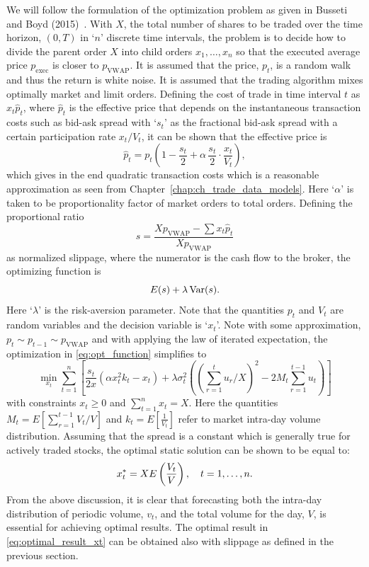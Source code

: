 We will follow the formulation of the optimization problem as given in Busseti and Boyd (2015)~\cite{busseli_boyd}. With $X$, the total number of shares to be traded over the time horizon, $(0,T)$ in `$n$' discrete time intervals, the problem is to decide how to divide the parent order $X$ into child orders $x_1, \ldots, x_n$ so that the executed average price $p_{\text{exec}}$ is closer to $p_{\text{VWAP}}$. It is assumed that the price, $p_t$, is a random walk and thus the return is white noise. It is assumed that the trading algorithm mixes optimally market and limit orders. Defining the cost of trade in time interval $t$ as $x_t \hat{p}_t$, where $\hat{p}_t$ is the effective price that depends on the instantaneous transaction costs such as bid-ask spread with `$s_t$' as the fractional bid-ask spread with a certain participation rate $x_t/V_t$, it can be shown that the effective price is
	\begin{equation}
	\hat{p}_t= p_t \left(1 - \dfrac{s_t}{2} + \alpha \, \dfrac{s_t}{2} \cdot \dfrac{x_t}{V_t} \right),
	\end{equation}
which gives in the end quadratic transaction costs which is a reasonable approximation as seen from Chapter~\ref{chap:ch_trade_data_models}. Here `$\alpha$' is taken to be proportionality factor of market orders to total orders. Defining the proportional ratio
	\begin{equation}
	s= \dfrac{X p_{\text{VWAP}} - \sum x_t \hat{p}_t}{X p_{\text{VWAP}}}
	\end{equation}
as normalized slippage, where the numerator is the cash flow to the broker, the optimizing function is
	\begin{equation} \label{eq:opt_function}
	E(s) + \lambda \var(s).
	\end{equation}
Here `$\lambda$' is the risk-aversion parameter. Note that the quantities $p_t$ and $V_t$ are random variables and the decision variable is `$x_t$'. Note with some approximation, $p_t \sim p_{t-1} \sim p_{\text{VWAP}}$ and with applying the law of iterated expectation, the optimization in \eqref{eq:opt_function} simplifies to
	\begin{equation}
	\min_{x_t} \sum_{t=1}^n \left[ \dfrac{s_t}{2x} (\alpha x_t^2 k_t - x_t) + \lambda \sigma_t^2 \left( \left( \sum_{r=1}^t u_r/X \right)^2 - 2 M_t \sum_{r=1}^{t-1} u_t \right) \right]
	\end{equation}
with constraints $x_t \geq 0$ and $\sum_{t=1}^n x_t = X$. Here the quantities $M_t= E \left[ \sum_{r=1}^{t-1} V_t/V \right]$ and $k_t= E[\frac{1}{V_t}]$ refer to market intra-day volume distribution. Assuming that the spread is a constant which is generally true for actively traded stocks, the optimal static solution can be shown to be equal to:
	\begin{equation} \label{eq:optimal_result_xt}
	x_t^*= X E\left(\dfrac{V_t}{V}\right), \enskip\enskip t=1,\ldots,n.
	\end{equation}
From the above discussion, it is clear that forecasting both the intra-day distribution of periodic volume, $v_t$, and the total volume for the day, $V$, is essential for achieving optimal results. The optimal result in \eqref{eq:optimal_result_xt} can be obtained also with slippage as defined in the previous section. \twomedskip


